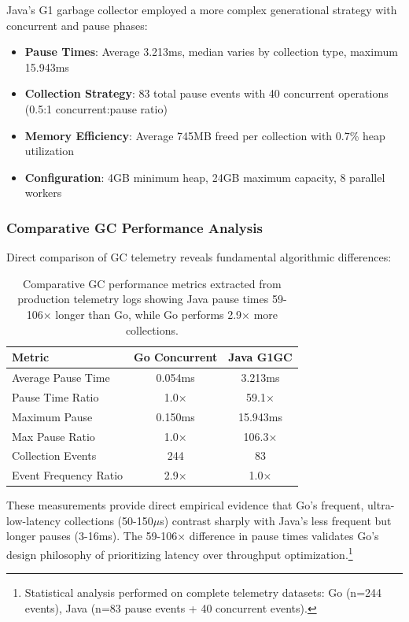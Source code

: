 \documentclass{article}
\begin{document}
Java's G1 garbage collector employed a more complex generational strategy with concurrent and pause phases:

\begin{itemize}
    \item \textbf{Pause Times}: Average 3.213ms, median varies by collection type, maximum 15.943ms
    \item \textbf{Collection Strategy}: 83 total pause events with 40 concurrent operations (0.5:1 concurrent:pause ratio)
    \item \textbf{Memory Efficiency}: Average 745MB freed per collection with 0.7\% heap utilization
    \item \textbf{Configuration}: 4GB minimum heap, 24GB maximum capacity, 8 parallel workers
\end{itemize}

\subsubsection{Comparative GC Performance Analysis}

Direct comparison of GC telemetry reveals fundamental algorithmic differences:

\begin{table}[h]
  \centering
  \begin{tabular}{@{}lcc@{}}
  \toprule
  Metric & Go Concurrent & Java G1GC \\
  \midrule
  Average Pause Time & 0.054ms & 3.213ms \\
  Pause Time Ratio & 1.0× & 59.1× \\
  Maximum Pause & 0.150ms & 15.943ms \\
  Max Pause Ratio & 1.0× & 106.3× \\
  Collection Events & 244 & 83 \\
  Event Frequency Ratio & 2.9× & 1.0× \\
  \bottomrule
  \end{tabular}
  \caption{Comparative GC performance metrics extracted from production telemetry logs showing Java pause times 59-106× longer than Go, while Go performs 2.9× more collections.}
  \label{tab:gc-comparison}
\end{table}

These measurements provide direct empirical evidence that Go's frequent, ultra-low-latency collections (50-150$\mu$s) contrast sharply with Java's less frequent but longer pauses (3-16ms). The 59-106× difference in pause times validates Go's design philosophy of prioritizing latency over throughput optimization.\footnote{Statistical analysis performed on complete telemetry datasets: Go (n=244 events), Java (n=83 pause events + 40 concurrent events).}
\end{document}
